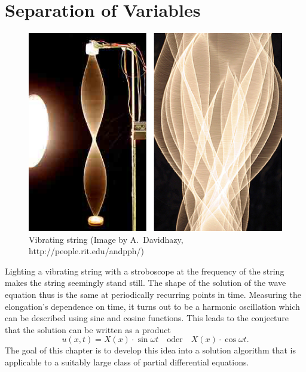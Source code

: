 %
%
%
\rhead{}
\chapter{Separation of Variables\label{chapter-separation}}
\begin{figure}
\begin{center}
\includegraphics[width=0.8\hsize]{../common/graphics/stringvibrlarge-10-06-06.jpg}
\end{center}
\caption{
Vibrating string
(Image by A.~Davidhazy, http://people.rit.edu/andpph/)
\label{separation:schwingendesaite}}
\end{figure}
Lighting a vibrating string with a stroboscope at the frequency of the
string makes the string seemingly stand still.
The shape of the solution of the wave equation thus is the same
at periodically recurring points in time.
Measuring the elongation's dependence on time, it turns out to be
a harmonic oscillation which can be described using sine and cosine
functions.
This leads to the conjecture that the solution can be written as 
a product
\[
u(x,t)=X(x)\cdot\sin\omega t\quad\text{oder}\quad X(x)\cdot\cos\omega t.
\]
The goal of this chapter is to develop this idea into a solution
algorithm that is applicable to a suitably large class of partial
differential equations.









